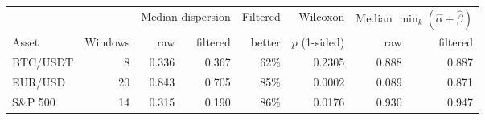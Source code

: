 \begin{tabular}{lrrrrrrr}
\toprule
 & & \multicolumn{2}{c}{Median dispersion} & Filtered & Wilcoxon & \multicolumn{2}{c}{Median $\min_k(\hat\alpha+\hat\beta)$} \\
\cmidrule(lr){3-4}\cmidrule(lr){7-8}
Asset & Windows & raw & filtered & better & $p$ (1-sided) & raw & filtered \\
\midrule
BTC/USDT & 8 & 0.336 & 0.367 & 62\% & 0.2305 & 0.888 & 0.887 \\
EUR/USD & 20 & 0.843 & 0.705 & 85\% & 0.0002 & 0.089 & 0.871 \\
S\&P 500 & 14 & 0.315 & 0.190 & 86\% & 0.0176 & 0.930 & 0.947 \\
\bottomrule
\end{tabular}